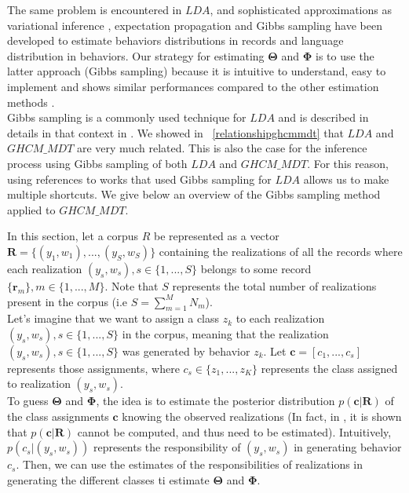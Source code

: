 The same problem is encountered in $LDA$, and sophisticated approximations as variational inference \cite{varinf}, expectation propagation \cite{expprop} and Gibbs sampling \cite{gibbs} have been developed to estimate behaviors distributions in records and language distribution in behaviors. Our strategy for estimating  $\boldsymbol{\Theta }$ and $\boldsymbol{\Phi }$ is to use the latter approach (Gibbs sampling) because it is intuitive to understand, easy to implement and shows similar performances compared to the other estimation methods \cite{inferencecomp}.
\\Gibbs sampling \cite{gibbsdef} is a commonly used technique for $LDA$ and is described in details in that context in \cite{gibbs}. We showed in ~\ref{relationshipghcmmdt} that $LDA$ and $GHCM\_MDT$ are very much related. This is also the case for the inference process using Gibbs sampling of both $LDA$ and $GHCM\_MDT$. For this reason, using references to works that used Gibbs sampling for $LDA$ allows us to make multiple shortcuts. We give below an overview of the Gibbs sampling method applied to $GHCM\_MDT$. \par

In this section, let a corpus $R$ be represented as a vector $\mathbf{R}=\{(y_{1},w_{1}),...,(y_{S},w_{S})\}$ containing the realizations of all the records where each realization $(y_{s},w_{s}), s\in \{1,...,S\}$ belongs to some record $\{\mathbf{r}_{m}\}, m\in \{1,...,M\}$. Note that $S$ represents the total number of realizations present in the corpus (i.e $S=\sum_{m=1}^{M}N_{m}$).
\\Let's imagine that we want to assign a class $z_{k}$ to each realization $(y_{s},w_{s}), s\in \{1,...,S\}$ in the corpus, meaning that the realization $(y_{s},w_{s}), s\in \{1,...,S\}$ was generated by behavior $z_{k}$. Let $\mathbf{c}=[c_{1},...,c_{s}]$ represents those assignments, where $c_{s}\in \{z_{1},...,z_{K}\}$ represents the class assigned to realization $(y_{s},w_{s})$.
\\To guess $\boldsymbol{\Theta }$ and $\boldsymbol{\Phi }$, the idea is to estimate the  posterior distribution $p(\mathbf{c}|\mathbf{R})$ of the class assignments $\mathbf{c}$ knowing the observed realizations (In fact, in \cite{gibbs}, it is shown that $p(\mathbf{c}|\mathbf{R})$ cannot be computed, and thus need to be estimated). Intuitively, $p(c_{s}|(y_{s},w_{s}))$ represents the responsibility of $(y_{s},w_{s})$ in generating behavior $c_{s}$. Then, we can use the estimates of the responsibilities of realizations in generating the different classes ti estimate $\boldsymbol{\Theta }$ and $\boldsymbol{\Phi }$. \par

